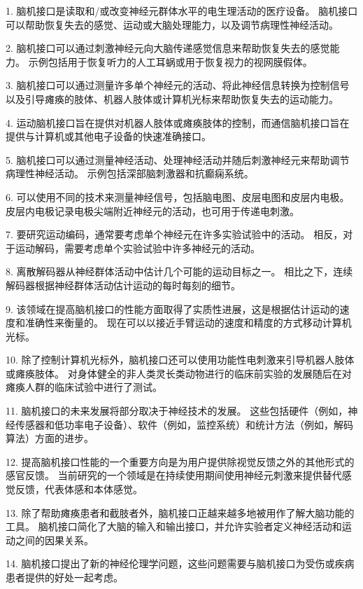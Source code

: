 1. 脑机接口是读取和/或改变神经元群体水平的电生理活动的医疗设备。
脑机接口可以帮助恢复失去的感觉、运动或大脑处理能力，以及调节病理性神经活动。


2. 脑机接口可以通过刺激神经元向大脑传递感觉信息来帮助恢复失去的感觉能力。
示例包括用于恢复听力的人工耳蜗或用于恢复视力的视网膜假体。


3. 脑机接口可以通过测量许多单个神经元的活动、将此神经信息转换为控制信号以及引导瘫痪的肢体、机器人肢体或计算机光标来帮助恢复失去的运动能力。


4. 运动脑机接口旨在提供对机器人肢体或瘫痪肢体的控制，而通信脑机接口旨在提供与计算机或其他电子设备的快速准确接口。


5. 脑机接口可以通过测量神经活动、处理神经活动并随后刺激神经元来帮助调节病理性神经活动。
示例包括深部脑刺激器和抗癫痫系统。


6. 可以使用不同的技术来测量神经信号，包括脑电图、皮层电图和皮层内电极。
皮层内电极记录电极尖端附近神经元的活动，也可用于传递电刺激。


7. 要研究运动编码，通常要考虑单个神经元在许多实验试验中的活动。
相反，对于运动解码，需要考虑单个实验试验中许多神经元的活动。


8. 离散解码器从神经群体活动中估计几个可能的运动目标之一。
相比之下，连续解码器根据神经群体活动估计运动的每时每刻的细节。


9. 该领域在提高脑机接口的性能方面取得了实质性进展，这是根据估计运动的速度和准确性来衡量的。
现在可以以接近手臂运动的速度和精度的方式移动计算机光标。


10. 除了控制计算机光标外，脑机接口还可以使用功能性电刺激来引导机器人肢体或瘫痪肢体。
对身体健全的非人类灵长类动物进行的临床前实验的发展随后在对瘫痪人群的临床试验中进行了测试。


11. 脑机接口的未来发展将部分取决于神经技术的发展。
这些包括硬件（例如，神经传感器和低功率电子设备）、软件（例如，监控系统）和统计方法（例如，解码算法）方面的进步。


12. 提高脑机接口性能的一个重要方向是为用户提供除视觉反馈之外的其他形式的感官反馈。
当前研究的一个领域是在持续使用期间使用神经元刺激来提供替代感觉反馈，代表体感和本体感觉。


13. 除了帮助瘫痪患者和截肢者外，脑机接口正越来越多地被用作了解大脑功能的工具。
脑机接口简化了大脑的输入和输出接口，并允许实验者定义神经活动和运动之间的因果关系。


14. 脑机接口提出了新的神经伦理学问题，这些问题需要与脑机接口为受伤或疾病患者提供的好处一起考虑。

